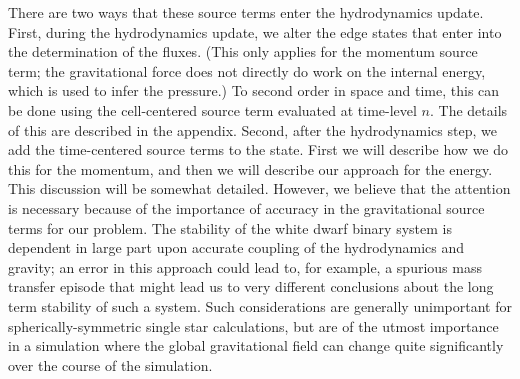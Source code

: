\documentclass[iop]{../emulateapj}
\begin{document}
There are two ways that these source terms enter the hydrodynamics update.
First, during the hydrodynamics update, we alter the edge states that enter
into the determination of the fluxes. (This only applies for the momentum source term;
the gravitational force does not directly do work on the internal energy, which is used 
to infer the pressure.) To second order in space and time, 
this can be done using the cell-centered
source term evaluated at time-level $n$. The details of this are described in 
the appendix. Second, after the hydrodynamics step, we add the time-centered source terms
to the state. First we will describe how we do this for the momentum,
and then we will describe our approach for the energy. This discussion will be somewhat detailed.
However, we believe that the attention is necessary because of the importance of accuracy
in the gravitational source terms for our problem. The stability of the white dwarf binary
system is dependent in large part upon accurate coupling of the hydrodynamics and gravity;
an error in this approach could lead to, for example, a spurious mass transfer episode
that might lead us to very different conclusions about the long term stability of such a system.
Such considerations are generally unimportant for spherically-symmetric single star calculations,
but are of the utmost importance in a simulation where the global gravitational field can change 
quite significantly over the course of the simulation.
\end{document}
